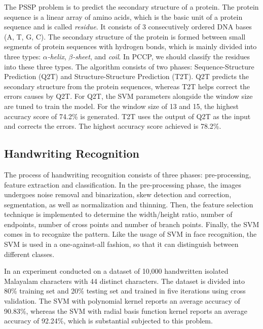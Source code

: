 The PSSP problem is to predict the secondary structure of a protein. The
protein sequence is a linear array of amino acids, which is the basic unit
of a protein sequence and is called \emph{residue}.
It consists of 3 consecutively ordered DNA bases (A, T, G, C). 
The secondary structure of the protein is formed between small segments of 
protein sequences with hydrogen bonds, which is mainly divided into 
three types: \emph{$\alpha$-helix}, \emph{$\beta$-sheet}, and \emph{coil}. 
In PCCP, we should classify the residues into these three types.
The algorithm consists of two phases: Sequence-Structure Prediction (Q2T) and
Structure-Structure Prediction (T2T). Q2T predicts the secondary structure
from the protein sequences, whereas T2T helps correct the errors
causes by Q2T. For Q2T, the SVM parameters alongside the window size are tuned
to train the model. For the window size of 13 and 15, the highest accuracy score
of 74.2\% is generated. T2T uses the output of Q2T as the input and corrects
the errors. The highest accuracy score achieved is 78.2\%.
\cite{bioinformatics}

\subsection*{Handwriting Recognition}
The process of handwriting recognition consists of three phases:
pre-processing, feature extraction and classification. In the pre-processing
phase, the images undergoes noise removal and binarization, skew detection
and correction, segmentation, as well as normalization and thinning. Then, 
the feature selection technique is implemented to determine the width/height
ratio, number of endpoints, number of cross points and number of branch
points. Finally, the SVM comes in to recognize the pattern. Like the usage of
SVM in face recognition, the SVM is used in a one-against-all fashion, so that
it can distinguish between different classes.

In an experiment conducted on a dataset of 10,000 handwritten isolated
Malayalam characters with 44 distinct characters. The dataset is divided
into 80\% training set and 20\% testing set and trained in five iterations
using cross validation. The SVM with polynomial kernel reports an average
accuracy of 90.83\%, whereas the SVM with radial basis function kernel
reports an average accuracy of 92.24\%, which is substantial subjected to 
this problem.
\cite{handwriting-recognition}
